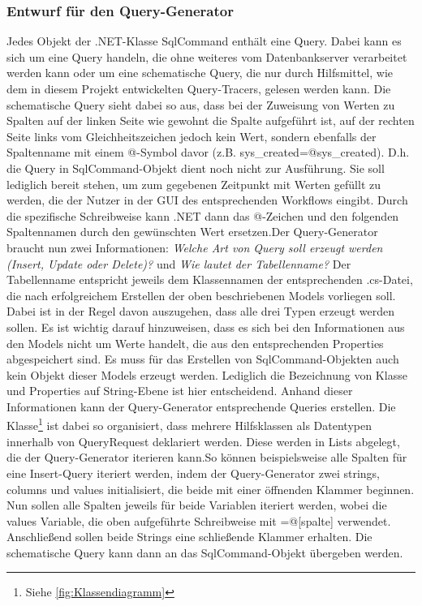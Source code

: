 \documentclass[11pt,toc=sectionentrywithoutdots, 
headheight=44pt, headings=optiontoheadandtoc, hyperfootnotes=false, hypertexnames=false]{scrartcl}
\newcommand\extendedref[1]{Siehe \ref{#1}}
\begin{document}
\subsubsection{Entwurf für den Query-Generator}
Jedes Objekt der .NET-Klasse SqlCommand enthält eine Query. Dabei kann es sich um eine Query handeln, die ohne weiteres vom Datenbankserver verarbeitet werden kann oder um eine schematische Query, die nur durch Hilfsmittel, wie dem in diesem Projekt entwickelten Query-Tracers, gelesen werden kann. Die schematische Query sieht dabei so aus, dass bei der Zuweisung von Werten zu Spalten auf der linken Seite wie gewohnt die Spalte aufgeführt ist, auf der rechten Seite links vom Gleichheitszeichen jedoch kein Wert, sondern ebenfalls der Spaltenname mit einem @-Symbol davor (z.B. \glqq sys\_created=@sys\_created\grqq). D.h. die Query in SqlCommand-Objekt dient noch nicht zur Ausführung. Sie soll lediglich bereit stehen, um zum gegebenen Zeitpunkt mit Werten gefüllt zu werden, die der Nutzer in der GUI des entsprechenden Workflows eingibt. Durch die spezifische Schreibweise kann .NET dann das @-Zeichen und den folgenden Spaltennamen durch den gewünschten Wert ersetzen.\newline\newline Der Query-Generator braucht nun zwei Informationen: \textit{Welche Art von Query soll erzeugt werden (Insert, Update oder Delete)?} und \textit{Wie lautet der Tabellenname?} Der Tabellenname entspricht jeweils dem Klassennamen der entsprechenden .cs-Datei, die nach erfolgreichem Erstellen der oben beschriebenen Models vorliegen soll. Dabei ist in der Regel davon auszugehen, dass alle drei Typen erzeugt werden sollen. Es ist wichtig darauf hinzuweisen, dass es sich bei den Informationen aus den Models nicht um Werte handelt, die aus den entsprechenden Properties abgespeichert sind. Es muss für das Erstellen von SqlCommand-Objekten auch kein Objekt dieser Models erzeugt werden. Lediglich die Bezeichnung von Klasse und Properties auf String-Ebene ist hier entscheidend. Anhand dieser Informationen kann der Query-Generator entsprechende Queries erstellen. Die Klasse\footnote{\extendedref{fig:Klassendiagramm}} ist dabei so organisiert, dass mehrere Hilfsklassen als Datentypen innerhalb von QueryRequest deklariert werden. Diese werden in Lists abgelegt, die der Query-Generator iterieren kann.\newline\newline So können beispielsweise alle Spalten für eine Insert-Query iteriert werden, indem der Query-Generator zwei strings, \glqq columns\grqq{} und \glqq values\grqq{} initialisiert, die beide mit einer öffnenden Klammer beginnen. Nun sollen alle Spalten jeweils für beide Variablen iteriert werden, wobei die values Variable, die oben aufgeführte Schreibweise mit \glqq [spalte]=@[spalte]\grqq{} verwendet. Anschließend sollen beide Strings eine schließende Klammer erhalten. Die schematische Query kann dann an das SqlCommand-Objekt übergeben werden.
\end{document}
